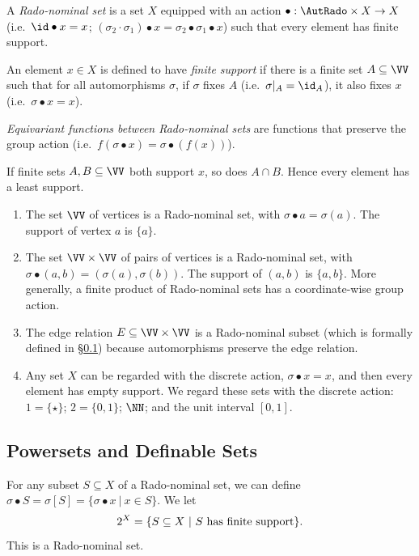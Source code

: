 \begin{definition}
  A \emph{Rado-nominal set} is a set $X$ equipped with an action
  $\bullet :\AutRado\times X\to X$ (i.e.~$\id\bullet x=x$; $(\sigma_2\cdot
  \sigma_1) \bullet x= \sigma_2\bullet \sigma_1\bullet x$) such that
  every element has finite support.

  An element $x\in X$ is defined to have \emph{finite support} if there is a finite set
  $A\subseteq \VV$ such that for all automorphisms $\sigma$, if $\sigma$ 
  fixes $A$ (i.e.~$\sigma|_A=\id_A$), it also fixes $x$ (i.e.~$\sigma\bullet x=x$).

  \emph{Equivariant functions between Rado-nominal sets} are functions that
  preserve the group action (i.e.~$f(\sigma\bullet x)=\sigma\bullet (f(x))$). 
\end{definition}
\begin{proposition}
  If finite sets $A,B\subseteq \VV$ both support $x$, so does $A\cap B$. Hence every
  element has a least support. 
\end{proposition}
\begin{example}
  \begin{enumerate}
    \item The set $\VV$ of vertices is a Rado-nominal set, with
      $\sigma\bullet a=\sigma(a)$. The support of vertex $a$ is $\{a\}$.
    \item The set $\VV\times \VV$ of pairs of vertices is a
      Rado-nominal set, with
            $\sigma\bullet (a,b)=(\sigma(a),\sigma(b))$. The support
            of $(a,b)$ is $\{a,b\}$.
            More generally, a finite product of Rado-nominal sets has a
            coordinate-wise group action.
          \item The edge relation $E\subseteq \VV\times \VV$ is a
            Rado-nominal subset (which is formally defined in \S\ref{sec:powersets-and-definiable-sets}) because automorphisms preserve the edge relation. 
            \item Any set $X$ can be regarded with the discrete
              action,
              $\sigma\bullet x=x$, and then every element has empty
              support.
              We regard these sets with the discrete action:
              $1=\{\star\}$; $2=\{0,1\}$; $\NN$; and the unit interval $[0,1]$.
              \end{enumerate}
          \end{example}
\subsection{Powersets and Definable Sets}
\label{sec:powersets-and-definiable-sets}
For any subset $S\subseteq X$ of a Rado-nominal set, we can define
$\sigma\bullet S=\sigma[S]= \{\sigma\bullet x~|~x\in S\}$. 
We let
\begin{equation}2^X=\{S\subseteq X~|~S \text{ has finite support}\}\text.\label{eqn:powerobject}\end{equation}
This is a Rado-nominal set.



